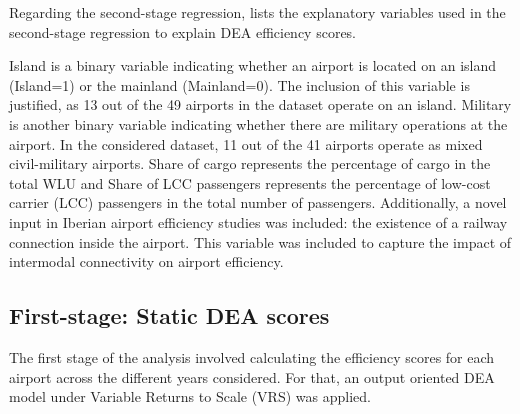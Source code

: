 Regarding the second-stage regression,  lists the explanatory variables used in the second-stage regression to explain DEA efficiency scores.


\begin{table}[h!]
  \begin{center}
        \caption{Summary Statistics for explanatory variables}
    \label{tab:exp_statistics}
  \end{center}
\end{table}
  
\vspace{-0.5cm}
Island is a binary variable indicating whether an airport is located on an island (Island=1) or the
mainland (Mainland=0). The inclusion of this variable is justified, as 13 out of the 49 airports in the
dataset operate on an island. Military is another binary variable indicating whether there are military
operations at the airport. In the considered dataset, 11 out of the 41 airports operate as mixed civil-military airports.
Share of cargo represents the percentage of cargo in the total WLU and Share of LCC passengers represents the percentage of low-cost carrier (LCC) passengers in the total
number of passengers. 
Additionally, a novel input in Iberian airport efficiency studies was included: the existence of a railway connection inside the airport. This variable was included to capture the impact of intermodal connectivity on airport efficiency.







\subsection{First-stage: Static DEA scores}
\label{subsec:resul_dea}  
The first stage of the analysis involved calculating the efficiency scores for each airport across the
different years considered. For that, an output oriented DEA model under Variable Returns to Scale
(VRS) was applied.

